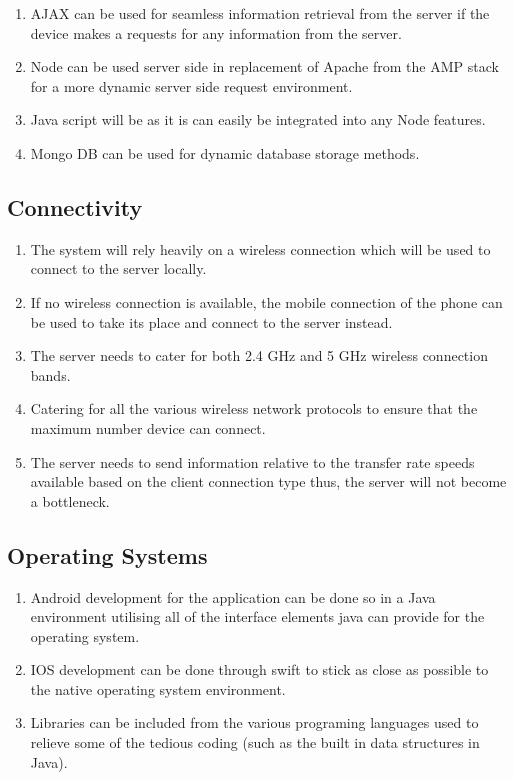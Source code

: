 \documentclass[11pt]{article}
\begin{document}
\begin{enumerate}

\item AJAX can be used for seamless information retrieval from the server if the device makes a requests for any information from the server.
\item Node can be used server side in replacement of Apache from the AMP stack for a more dynamic server side request environment.
\item Java script will be as it is can easily be integrated into any Node features.
\item Mongo DB can be used for dynamic database storage methods.

\end{enumerate}

\subsection{Connectivity}

\begin{enumerate}

\item The system will rely heavily on a wireless connection which will be used to connect to the server locally. 
\item If no wireless connection is available, the mobile connection of the phone can be used to take its place and connect to the server instead.
\item The server needs to cater for both 2.4 GHz and 5 GHz wireless connection bands.
\item Catering for all the various wireless network protocols to ensure that the maximum number device can connect. 
\item The server needs to send information relative to the transfer rate speeds available based on the client connection type thus, the server will not become a bottleneck. 

\end{enumerate}

\subsection{Operating Systems}

\begin{enumerate}

\item Android development for the application can be done so in a Java environment utilising all of the interface elements java can provide for the operating system.
\item IOS development can be done through swift to stick as close as possible to the native operating system environment. 
\item Libraries can be included from the various programing languages used to relieve some of the tedious coding (such as the built in data structures in Java).

\end{enumerate}
\end{document}
